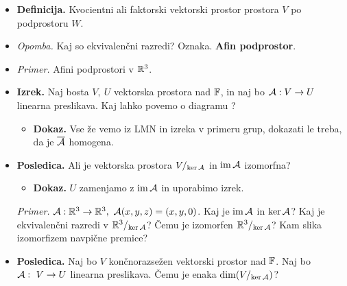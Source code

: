 \begin{enumerate}
\begin{itemize}
        (1) Ali je $V/_W$ vektorski prostor nad $\FF$?

        (2) Ali je kvocientna preslikava linearna?
        \begin{itemize}
            \item \colorbox{green!30}{\textbf{Dokaz.}} (1) Vemo že, da sta operacije dobro definirane in da je $(V/_W, +)$ Abelova grupa. Preverimo še ostale aksiome za vektorski prostor.
            
            (2) Vemo že, da je kvocientna preslikava homomorfizem grup $(V,+)$ in $(V/_W, +)$. Preverimo še homogenost.
        \end{itemize}
        \item \colorbox{purple!30}{\textbf{Definicija.}} Kvocientni ali faktorski vektorski prostor prostora $V$ po podprostoru $W$.
        \item \colorbox{yellow!30}{\emph{Opomba.}} Kaj so ekvivalenčni razredi?  Oznaka. \textbf{Afin podprostor}. 
        \item \colorbox{yellow!30}{\emph{Primer.}} Afini podprostori v $\mathbb{R}^3$.
        \item \colorbox{blue!30}{\textbf{Izrek.}} Naj bosta $V, \ U$ vektorska prostora nad $\FF$, in naj bo $\mathcal{A}: V \to U$ linearna preslikava. Kaj lahko povemo o diagramu ?
        \begin{itemize}
            \item \colorbox{green!30}{\textbf{Dokaz.}} Vse že vemo iz LMN in izreka v primeru grup, dokazati le treba, da je $\overline{\mathcal{A}}$ homogena.
        \end{itemize}
        \item \colorbox{orange!30}{\textbf{Posledica.}} Ali je vektorska prostora $V/_{\ker \mathcal{A}}$ in $\operatorname{im} \mathcal{A}$ izomorfna?
        \begin{itemize}
            \item \colorbox{green!30}{\textbf{Dokaz.}} $U$ zamenjamo z $\operatorname{im} \mathcal{A}$ in uporabimo izrek.
        \end{itemize}
        \colorbox{yellow!30}{\emph{Primer.}} $\mathcal{A}: \mathbb{R}^3 \to \mathbb{R}^3, \ \mathcal{A}(x,y,z) = (x, y, 0)$. Kaj je $\operatorname{im} \mathcal{A}$ in $\ker \mathcal{A}$? Kaj je ekvivalenčni razredi v $\mathbb{R}^3/_{\ker \mathcal{A}}$? Čemu je izomorfen $\mathbb{R}^3/_{\ker \mathcal{A}}$? Kam slika izomorfizem navpične premice?
        \item \colorbox{orange!30}{\textbf{Posledica.}} Naj bo $V$ končnorazsežen vektorski prostor nad $\FF$. Naj bo $\mathcal{A}: \ V \to U$ linearna preslikava. Čemu je enaka $\dim (V/_{\ker \mathcal{A}})$?

\end{itemize}
\end{enumerate}
